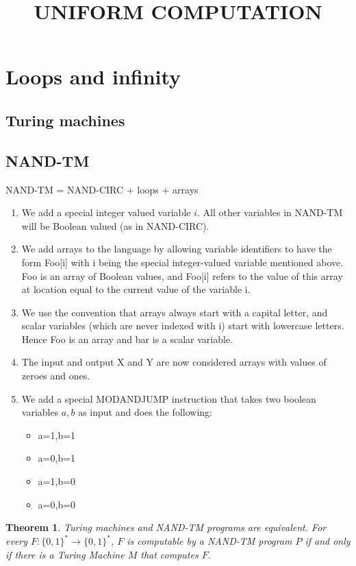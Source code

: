 \documentclass[aps,pra,onecolumn,notitlepage,superscriptaddress]{revtex4-1}
\newtheorem{theo}{Theorem}
\begin{document}
    \title{UNIFORM COMPUTATION}
    \author{}
    \maketitle
    
    \section{Loops and infinity}
    \subsection{Turing machines}
    \subsection{NAND-TM}
    NAND-TM = NAND-CIRC + loops + arrays
    \begin{enumerate}
        \item We add a special integer valued variable $i$. All other variables in NAND-TM will be Boolean valued (as in NAND-CIRC).
        \item We add arrays to the language by allowing variable identifiers to have the form Foo[i] with i being the special integer-valued variable mentioned above. Foo is an array of Boolean values, and Foo[i] refers to the value of this array at location equal to the current value of the variable i.
        \item We use the convention that arrays always start with a capital letter, and scalar variables (which are never indexed with i) start with lowercase letters. Hence Foo is an array and bar is a scalar variable.
        \item The input and output X and Y are now considered arrays with values of zeroes and ones.
        \item We add a special MODANDJUMP instruction that takes two boolean variables $a, b$ as input and does the following:
        \begin{itemize}
            \item a=1,b=1
            \item a=0,b=1
            \item a=1,b=0
            \item a=0,b=0
        \end{itemize}
    \end{enumerate}

    \begin{theo}
        Turing machines and NAND-TM programs are equivalent. For every $F: \{0, 1\}^* \to \{0, 1\}^*$, $F$ is computable by a NAND-TM program $P$ if and only if there is a Turing Machine $M$ that computes $F$.
    \end{theo}
\end{document}
